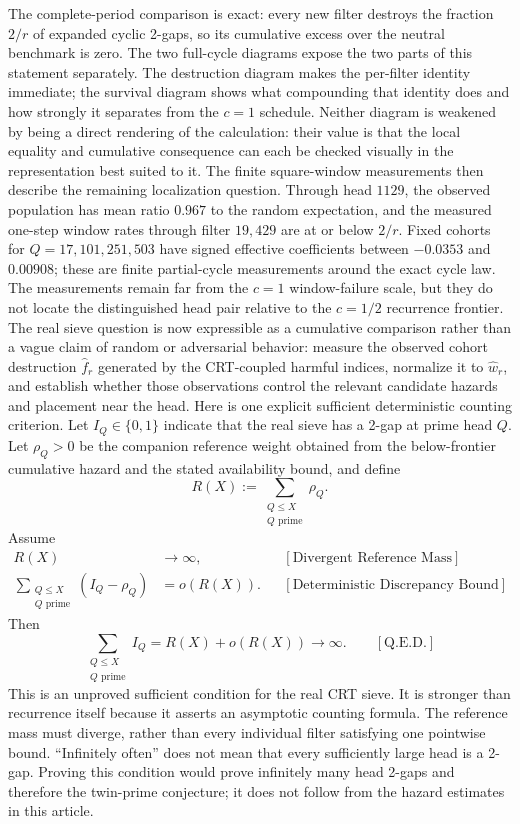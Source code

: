 The complete-period comparison is exact: every new filter destroys the fraction $2/r$ of expanded cyclic 2-gaps, so its cumulative excess over the neutral benchmark is zero. The two full-cycle diagrams expose the two parts of this statement separately. The destruction diagram makes the per-filter identity immediate; the survival diagram shows what compounding that identity does and how strongly it separates from the $c=1$ schedule. Neither diagram is weakened by being a direct rendering of the calculation: their value is that the local equality and cumulative consequence can each be checked visually in the representation best suited to it.
The finite square-window measurements then describe the remaining localization question. Through head $1129$, the observed population has mean ratio $0.967$ to the random expectation, and the measured one-step window rates through filter $19{,}429$ are at or below $2/r$. Fixed cohorts for $Q=17,101,251,503$ have signed effective coefficients between $-0.0353$ and $0.00908$; these are finite partial-cycle measurements around the exact cycle law. The measurements remain far from the $c=1$ window-failure scale, but they do not locate the distinguished head pair relative to the $c=1/2$ recurrence frontier.
The real sieve question is now expressible as a cumulative comparison rather than a vague claim of random or adversarial behavior: measure the observed cohort destruction $\widehat f_r$ generated by the CRT-coupled harmful indices, normalize it to $\widehat w_r$, and establish whether those observations control the relevant candidate hazards and placement near the head.
Here is one explicit sufficient deterministic counting criterion. Let $I_Q\in\{0,1\}$ indicate that the real sieve has a 2-gap at prime head $Q$. Let $\rho_Q>0$ be the companion reference weight obtained from the below-frontier cumulative hazard and the stated availability bound, and define
\begin{equation*}
R(X):=\sum_{\substack{Q\le X\\Q\text{ prime}}}\rho_Q.
\end{equation*}
Assume
\begin{equation*}
\begin{aligned}
R(X)&\longrightarrow\infty,
&&[\text{Divergent Reference Mass}]\\
\sum_{\substack{Q\le X\\Q\text{ prime}}}(I_Q-\rho_Q)
&=o(R(X)).
&&[\text{Deterministic Discrepancy Bound}]
\end{aligned}
\end{equation*}
Then
\begin{equation*}
\sum_{\substack{Q\le X\\Q\text{ prime}}}I_Q
=R(X)+o(R(X))
\longrightarrow\infty.
\qquad[\text{Q.E.D.}]
\end{equation*}
This is an unproved sufficient condition for the real CRT sieve. It is stronger than recurrence itself because it asserts an asymptotic counting formula. The reference mass must diverge, rather than every individual filter satisfying one pointwise bound. “Infinitely often” does not mean that every sufficiently large head is a 2-gap. Proving this condition would prove infinitely many head 2-gaps and therefore the twin-prime conjecture; it does not follow from the hazard estimates in this article.
